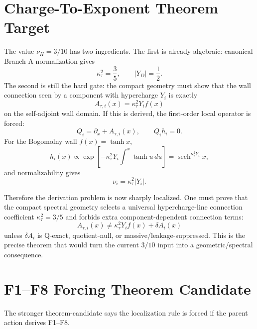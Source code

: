\documentclass[11pt]{article}
\begin{document}
\section{Charge-To-Exponent Theorem Target}
The value $\nu_H=3/10$ has two ingredients.  The first is already algebraic:
canonical Branch A normalization gives
\begin{equation}
\kappa_\tau^2=\frac35,\qquad |Y_D|=\frac12 .
\end{equation}
The second is still the hard gate: the compact geometry must show that the
wall connection seen by a component with hypercharge $Y_i$ is exactly
\begin{equation}
A_{\tau,i}(x)=\kappa_\tau^2Y_i f(x)
\end{equation}
on the self-adjoint wall domain.  If this is derived, the first-order local
operator is forced:
\begin{equation}
Q_i=\partial_x+A_{\tau,i}(x),
\qquad
Q_i h_i=0 .
\end{equation}
For the Bogomolny wall $f(x)=\tanh x$,
\begin{equation}
h_i(x)\propto
\exp\left[-\kappa_\tau^2Y_i\int^x\tanh u\,du\right]
=\operatorname{sech}^{\kappa_\tau^2Y_i}x,
\end{equation}
and normalizability gives
\begin{equation}
\nu_i=\kappa_\tau^2|Y_i|.
\end{equation}

Therefore the derivation problem is now sharply localized.  One must prove
that the compact spectral geometry selects a universal hypercharge-line
connection coefficient $\kappa_\tau^2=3/5$ and forbids extra component-dependent
connection terms:
\begin{equation}
A_{\tau,i}(x)\neq
\kappa_\tau^2Y_i f(x)+\delta A_i(x)
\end{equation}
unless $\delta A_i$ is Q-exact, quotient-null, or massive/leakage-suppressed.
This is the precise theorem that would turn the current $3/10$ input into a
geometric/spectral consequence.

\section{F1--F8 Forcing Theorem Candidate}
The stronger theorem-candidate says the localization rule is forced if the
parent action derives F1--F8.
\end{document}
